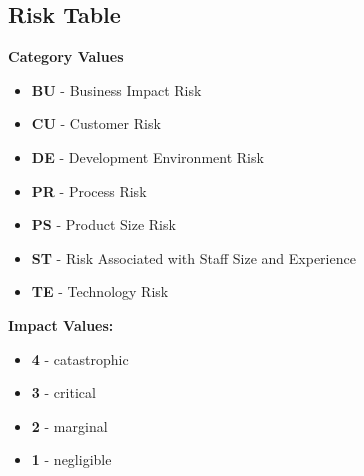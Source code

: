 \documentclass[english,12pt]{article}
\begin{document}
\subsection{Risk Table}
\begin{varwidth}[t]{.5\textwidth}
  \textbf{Category Values}
  \begin{itemize}
    \item \textbf{BU} - Business Impact Risk
    \item \textbf{CU} - Customer Risk
    \item \textbf{DE} - Development Environment Risk
    \item \textbf{PR} - Process Risk
    \item \textbf{PS} - Product Size Risk
    \item \textbf{ST} - Risk Associated with Staff Size and Experience 
    \item \textbf{TE} - Technology Risk 
  \end{itemize}
  \end{varwidth}
  \hspace{4em}
  \begin{varwidth}[t]{.5\textwidth}
  \textbf{Impact Values:}
  \begin{itemize}
    \item \textbf{4} - catastrophic
    \item \textbf{3} - critical
    \item \textbf{2} - marginal
    \item \textbf{1} - negligible
  \end{itemize}
\end{varwidth}
\end{document}
